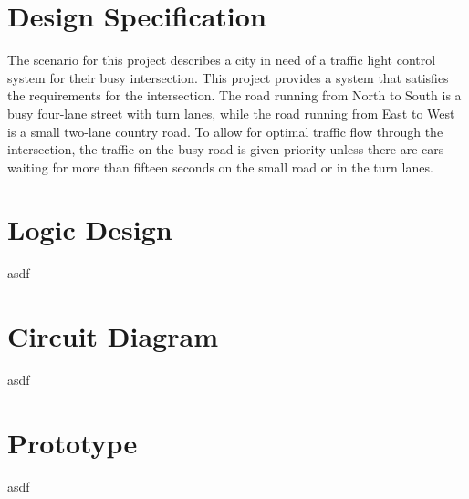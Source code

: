 \section{Design Specification}
The scenario for this project describes a city in need of a traffic light control system for their busy intersection. This project provides a system that satisfies the requirements for the intersection. The road running from North to South is a busy four-lane street with turn lanes, while the road running from East to West is a small two-lane country road. To allow for optimal traffic flow through the intersection, the traffic on the busy road is given priority unless there are cars waiting for more than fifteen seconds on the small road or in the turn lanes.
\section{Logic Design}
asdf

\section{Circuit Diagram}
asdf

\section{Prototype}
asdf
